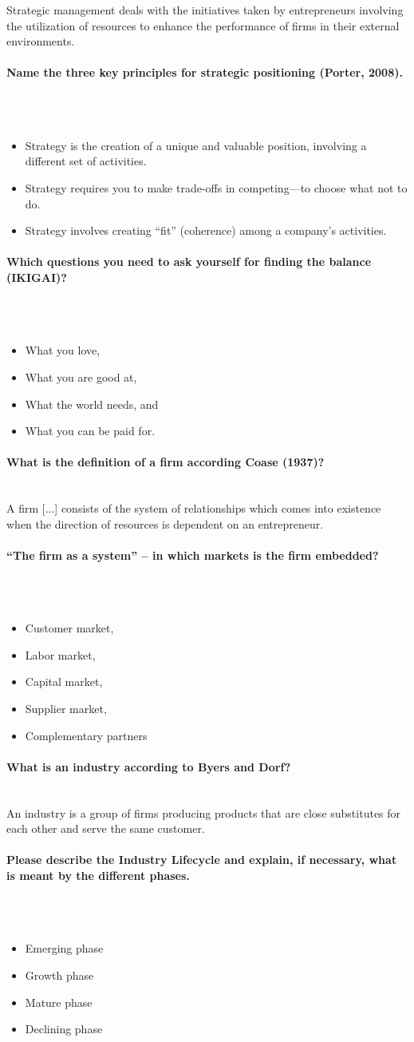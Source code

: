 \documentclass[10pt,a4paper,noendnumber=true]{scrartcl}
\newcommand{\properparagraph}[1]{\paragraph{\textcolor{Emerald}{#1}}\mbox{}\\}
\begin{document}
Strategic management deals with the initiatives taken by entrepreneurs involving the utilization of resources to enhance the performance of firms in their external environments.

\properparagraph{Name the three key principles for strategic positioning (Porter, 2008).}
\\[-6ex]
\begin{itemize}
	\item Strategy is the creation of a unique and valuable position, involving a different set of activities.
	\item Strategy requires you to make	trade-offs in competing—to choose what not to do.
	\item Strategy involves creating “fit” (coherence) among a company’s activities.
\end{itemize}

\properparagraph{Which questions you need to ask yourself for finding the balance (IKIGAI)?}
\\[-6ex]
\begin{itemize}
	\item What you love,
	\item What you are good at,
	\item What the world needs, and
	\item What you can be paid for.
\end{itemize}

\properparagraph{What is the definition of a firm according Coase (1937)?}
A firm [...] consists of the system of relationships which comes into existence when the direction of resources is dependent on an entrepreneur.

\properparagraph{“The firm as a system” – in which markets is the firm embedded?}
\\[-6ex]
\begin{itemize}
	\item Customer market,
	\item Labor market,
	\item Capital market,
	\item Supplier market,
	\item Complementary partners
\end{itemize}

\properparagraph{What is an industry according to Byers and Dorf?}
An industry is a group of firms producing products that are close substitutes for each other and serve the same customer.

\properparagraph{Please describe the Industry Lifecycle and explain, if necessary, what is meant by the different phases.}
\\[-6ex]
\begin{itemize}
	\item Emerging phase
	\item Growth phase
	\item Mature phase
	\item Declining phase
\end{itemize}
\end{document}

